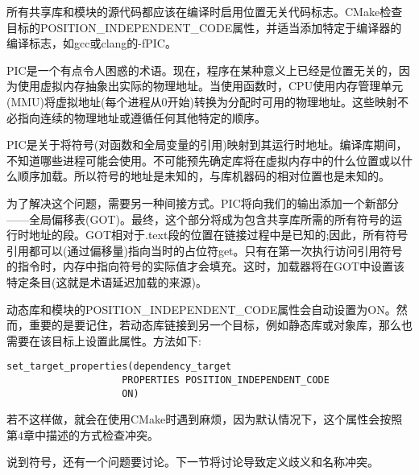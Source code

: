 所有共享库和模块的源代码都应该在编译时启用位置无关代码标志。CMake检查目标的POSITION\_INDEPENDENT\_CODE属性，并适当添加特定于编译器的编译标志，如gcc或clang的-fPIC。

PIC是一个有点令人困惑的术语。现在，程序在某种意义上已经是位置无关的，因为使用虚拟内存抽象出实际的物理地址。当使用函数时，CPU使用内存管理单元(MMU)将虚拟地址(每个进程从0开始)转换为分配时可用的物理地址。这些映射不必指向连续的物理地址或遵循任何其他特定的顺序。

PIC是关于将符号(对函数和全局变量的引用)映射到其运行时地址。编译库期间，不知道哪些进程可能会使用。不可能预先确定库将在虚拟内存中的什么位置或以什么顺序加载。所以符号的地址是未知的，与库机器码的相对位置也是未知的。

为了解决这个问题，需要另一种间接方式。PIC将向我们的输出添加一个新部分——全局偏移表(GOT)。最终，这个部分将成为包含共享库所需的所有符号的运行时地址的段。GOT相对于.text段的位置在链接过程中是已知的;因此，所有符号引用都可以(通过偏移量)指向当时的占位符get。只有在第一次执行访问引用符号的指令时，内存中指向符号的实际值才会填充。这时，加载器将在GOT中设置该特定条目(这就是术语延迟加载的来源)。

动态库和模块的POSITION\_INDEPENDENT\_CODE属性会自动设置为ON。然而，重要的是要记住，若动态库链接到另一个目标，例如静态库或对象库，那么也需要在该目标上设置此属性。方法如下:

\begin{lstlisting}[style=styleCMake]
set_target_properties(dependency_target
					PROPERTIES POSITION_INDEPENDENT_CODE
					ON)
\end{lstlisting}

若不这样做，就会在使用CMake时遇到麻烦，因为默认情况下，这个属性会按照第4章中描述的方式检查冲突。

说到符号，还有一个问题要讨论。下一节将讨论导致定义歧义和名称冲突。











